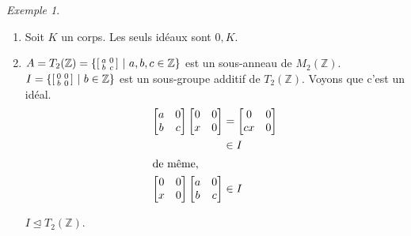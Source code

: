 \documentclass{report}
\theoremstyle{definition}
\theoremstyle{remark}
\newtheorem*{exem}{Exemple}
\def\ZZ{\mathbb{Z}}
\begin{document}
\begin{exem}
\begin{enumerate}
			Concr\`etement, avec $n=6$. $A = \{\overline0, \overline1, \overline2, \overline3, \overline4, \overline5\}$. Si $k=1$, on a $A$. Si $k=2$, on a $2\ZZ_6 = \{\overline0, \overline2, \overline4\}$. Si $k=3$, on a $3\ZZ_6 = \{\overline0, \overline3\}$. Si $k=6$, on a $6\ZZ_6 = \{\overline0\}$.
			\item Soit $K$ un corps. Les seuls id\'eaux sont $0,K$.
			\item $A = T_2(\ZZ) = \left\{ \begin{bsmallmatrix}
				a&0\\b&c
			\end{bsmallmatrix} ~\middle|~ a,b,c\in\ZZ \right\}$ est un sous-anneau de $M_2(\ZZ)$. $I = \left\{ \begin{bsmallmatrix}
				0&0\\b&0
			\end{bsmallmatrix} ~\middle|~ b\in\ZZ \right\}$ est un sous-groupe additif de $T_2(\ZZ)$. Voyons que c'est un id\'eal.
			\begin{align*}
				\begin{bmatrix}
					a&0\\b&c
				\end{bmatrix} \begin{bmatrix}
					0&0\\x&0
				\end{bmatrix}&= \begin{bmatrix}
					0&0\\cx&0
				\end{bmatrix}\\
				&\in I\\
				\shortintertext{de m\^eme,}
				\begin{bmatrix}
					0&0\\x&0
				\end{bmatrix} \begin{bmatrix}
					a&0\\b&c
				\end{bmatrix}&\in I
			\end{align*}

			$I \trianglelefteq T_2(\ZZ)$.


\end{enumerate}
\end{exem}
\end{document}
